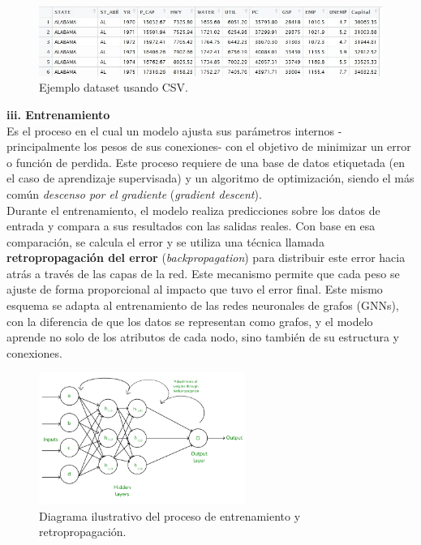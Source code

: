 \documentclass[11pt]{article} %
\begin{document}
\begin{figure}[H]
    \centering
    \includegraphics[width=1\textwidth]{Images/ejemplo csv2.jpg}
    \caption{Ejemplo dataset usando CSV.}
    \label{fig:Dataset-CSV}
\end{figure}
\vspace{8pt}
\textbf{iii. Entrenamiento} \\[3pt]
Es el proceso en el cual un modelo ajusta sus parámetros internos -principalmente los pesos de sus conexiones- con el objetivo de minimizar un error o función de perdida. Este proceso requiere de una base de datos etiquetada (en el caso de aprendizaje supervisada) y un algoritmo de optimización, siendo el más común \textit{descenso por el gradiente} (\textit{gradient descent}).\\[1pt]
Durante el entrenamiento, el modelo realiza predicciones sobre los datos de entrada y compara a sus resultados con las salidas reales. Con base en esa comparación, se calcula el error y se utiliza una técnica llamada \textbf{retropropagación del error} 
(\textit{backpropagation}) para distribuir este error hacia atrás a través de las capas de la red. Este mecanismo permite que cada peso se ajuste de forma proporcional al impacto que tuvo el error final. Este mismo esquema se adapta al entrenamiento de las redes neuronales de grafos (GNNs), con la diferencia de que los datos se representan como grafos, y el modelo aprende no solo de los atributos de cada nodo, sino también de su estructura y conexiones.
\begin{figure}[H]
    \centering
    \includegraphics[width = 0.6\textwidth]{Images/Frame-13.png}
    \caption{Diagrama ilustrativo del proceso de entrenamiento y retropropagación.}
    \label{fig:Backpropagaion}
\end{figure}
\end{document}
